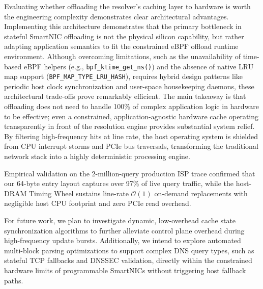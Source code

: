 \documentclass[a4paper,fleqn,colorlinks,hidelinks]{cas-sc}
\begin{document}
Evaluating whether offloading the resolver's caching layer to hardware is worth the engineering complexity demonstrates clear architectural advantages. Implementing this architecture demonstrates that the primary bottleneck in stateful SmartNIC offloading is not the physical silicon capability, but rather adapting application semantics to fit the constrained eBPF offload runtime environment. Although overcoming limitations, such as the unavailability of time-based eBPF helpers (e.g., \texttt{bpf\_ktime\_get\_ns()}) and the absence of native LRU map support (\texttt{BPF\_MAP\_TYPE\_LRU\_HASH}), requires hybrid design patterns like periodic host clock synchronization and user-space housekeeping daemons, these architectural trade-offs prove remarkably efficient. The main takeaway is that offloading does not need to handle 100\% of complex application logic in hardware to be effective; even a constrained, application-agnostic hardware cache operating transparently in front of the resolution engine provides substantial system relief. By filtering high-frequency hits at line rate, the host operating system is shielded from CPU interrupt storms and PCIe bus traversals, transforming the traditional network stack into a highly deterministic processing engine.

Empirical validation on the 2-million-query production ISP trace confirmed that our 64-byte entry layout captures over 97\% of live query traffic, while the host-DRAM Timing Wheel sustains line-rate $\mathcal{O}(1)$ on-demand replacements with negligible host CPU footprint and zero PCIe read overhead.

For future work, we plan to investigate dynamic, low-overhead cache state synchronization algorithms to further alleviate control plane overhead during high-frequency update bursts. Additionally, we intend to explore automated multi-block parsing optimizations to support complex DNS query types, such as stateful TCP fallbacks and DNSSEC validation, directly within the constrained hardware limits of programmable SmartNICs without triggering host fallback paths.
\printcredits

%






\end{document}
